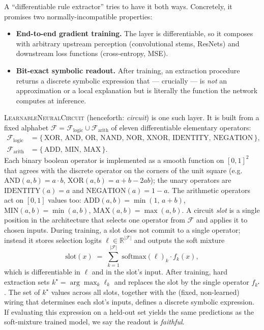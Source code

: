 \documentclass{article}
\newcommand{\R}{\mathbb{R}}
\newcommand{\circuit}{\textsc{LearnableNeuralCircuit}}
\begin{document}
A ``differentiable rule extractor'' tries to have it both ways.
Concretely, it promises two normally-incompatible properties:
\begin{itemize}
  \item \textbf{End-to-end gradient training.} The layer is differentiable, so it composes with arbitrary upstream perception (convolutional stems, ResNets) and downstream loss functions (cross-entropy, MSE).
  \item \textbf{Bit-exact symbolic readout.} After training, an extraction procedure returns a discrete symbolic expression that --- crucially --- is \emph{not} an approximation or a local explanation but is literally the function the network computes at inference.
\end{itemize}
\circuit{} (henceforth: \emph{circuit}) is one such layer.
It is built from a fixed alphabet $\mathcal{F} = \mathcal{F}_{\text{logic}} \cup \mathcal{F}_{\text{arith}}$ of eleven differentiable elementary operators:
\begin{align*}
  \mathcal{F}_{\text{logic}} &= \{\,\text{XOR},\, \text{AND},\, \text{OR},\, \text{NAND},\, \text{NOR},\, \text{XNOR},\, \text{IDENTITY},\, \text{NEGATION}\,\}, \\
  \mathcal{F}_{\text{arith}} &= \{\,\text{ADD},\, \text{MIN},\, \text{MAX}\,\}.
\end{align*}
Each binary boolean operator is implemented as a smooth function on $[0,1]^2$ that agrees with the discrete operator on the corners of the unit square (e.g.\ $\text{AND}(a,b) = a \cdot b$, $\text{XOR}(a,b) = a + b - 2ab$); the unary operators are $\text{IDENTITY}(a) = a$ and $\text{NEGATION}(a) = 1 - a$.
The arithmetic operators act on $[0,1]$ values too: $\text{ADD}(a,b) = \min(1,\, a+b)$, $\text{MIN}(a,b) = \min(a,b)$, $\text{MAX}(a,b) = \max(a,b)$.
A circuit \emph{slot} is a single position in the architecture that selects one operator from $\mathcal{F}$ and applies it to chosen inputs.
During training, a slot does not commit to a single operator; instead it stores selection logits $\boldsymbol{\ell} \in \R^{|\mathcal{F}|}$ and outputs the soft mixture
\begin{equation}
  \mathrm{slot}(x) \;=\; \sum_{k=1}^{|\mathcal{F}|}\, \mathrm{softmax}(\boldsymbol{\ell})_k \cdot f_k(x),
  \label{eq:soft-mixture}
\end{equation}
which is differentiable in $\boldsymbol{\ell}$ and in the slot's input.
After training, hard extraction sets $k^\star = \arg\max_k \ell_k$ and replaces the slot by the single operator $f_{k^\star}$.
The set of $k^\star$ values across all slots, together with the (fixed, non-learned) wiring that determines each slot's inputs, defines a discrete symbolic expression.
If evaluating this expression on a held-out set yields the same predictions as the soft-mixture trained model, we say the readout is \emph{faithful}.
\end{document}
